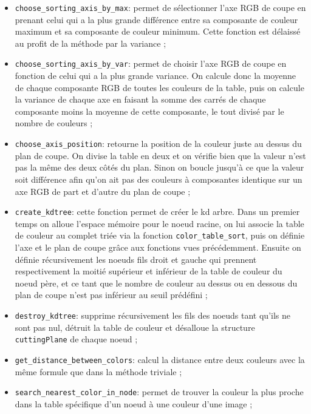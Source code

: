 \documentclass[a4paper,11pt,final]{article}
\begin{document}
\begin{itemize}
\item\texttt{choose\_sorting\_axis\_by\_max}: permet de sélectionner l’axe RGB de coupe en prenant celui qui a la plus grande différence entre sa composante de couleur maximum et sa composante de couleur minimum. Cette fonction est délaissé au profit de la méthode par la variance ;
\item\texttt{choose\_sorting\_axis\_by\_var}: permet de choisir l’axe RGB de coupe en fonction de celui qui a la plus grande variance. On calcule donc la moyenne de chaque composante RGB de toutes les couleurs de la table, puis on calcule la variance de chaque axe en faisant la somme des carrés de chaque composante moins la moyenne de cette composante, le tout divisé par le nombre de couleurs ;
\item\texttt{choose\_axis\_position}: retourne la position de la couleur juste au dessus du plan de coupe. On divise la table en deux et on vérifie bien que la valeur n’est pas la même des deux côtés du plan. Sinon on boucle jusqu’à ce que la valeur soit différence afin qu’on ait pas des couleurs à composantes identique sur un axe RGB de part et d’autre du plan de coupe ;
\item\texttt{create\_kdtree}: cette fonction permet de créer le kd arbre. Dans un premier temps on alloue l’espace mémoire pour le noeud racine, on lui associe la table de couleur au complet triée via la fonction \texttt{color\_table\_sort}, puis on définie l’axe et le plan de coupe grâce aux fonctions vues précédemment. Ensuite on définie récursivement les noeuds fils droit et gauche qui prennent respectivement la moitié supérieur et inférieur de la table de couleur du noeud père, et ce tant que le nombre de couleur au dessus ou en dessous du plan de coupe n’est pas inférieur au seuil prédéfini ;
\item\texttt{destroy\_kdtree}: supprime récursivement les fils des noeuds tant qu’ils ne sont pas nul, détruit la table de couleur et désalloue la structure \texttt{cuttingPlane} de chaque noeud ;
\item\texttt{get\_distance\_between\_colors}: calcul la distance entre deux couleurs avec la même formule que dans la méthode triviale ;
\item\texttt{search\_nearest\_color\_in\_node}: permet de trouver la couleur la plus proche dans la table spécifique d’un noeud à une couleur d’une image ;

\end{itemize}
\end{document}
